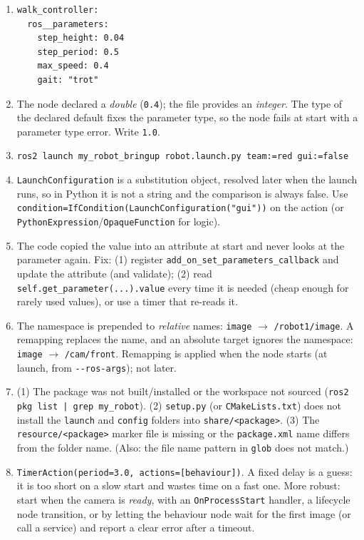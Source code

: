 \begin{enumerate}[label=\textbf{\ansnum.\arabic*}]
  \item
\begin{verbatim}
walk_controller:
  ros__parameters:
    step_height: 0.04
    step_period: 0.5
    max_speed: 0.4
    gait: "trot"
\end{verbatim}
  \item The node declared a \emph{double} (\verb!0.4!); the file provides an \emph{integer}. The type of the declared default fixes the parameter type, so the node fails at start with a parameter type error. Write \verb!1.0!.
  \item \verb!ros2 launch my_robot_bringup robot.launch.py team:=red gui:=false!
  \item \verb!LaunchConfiguration! is a substitution object, resolved later when the launch runs, so in Python it is not a string and the comparison is always false. Use \verb!condition=IfCondition(LaunchConfiguration("gui"))! on the action (or \verb!PythonExpression!/\verb!OpaqueFunction! for logic).
  \item The code copied the value into an attribute at start and never looks at the parameter again. Fix: (1) register \verb!add_on_set_parameters_callback! and update the attribute (and validate); (2) read \verb!self.get_parameter(...).value! every time it is needed (cheap enough for rarely used values), or use a timer that re-reads it.
  \item The namespace is prepended to \emph{relative} names: \verb!image! $\to$ \verb!/robot1/image!. A remapping replaces the name, and an absolute target ignores the namespace: \verb!image! $\to$ \verb!/cam/front!. Remapping is applied when the node starts (at launch, from \verb!--ros-args!); not later.
  \item (1) The package was not built/installed or the workspace not sourced (\verb!ros2 pkg list | grep my_robot!). (2) \verb!setup.py! (or \verb!CMakeLists.txt!) does not install the \verb!launch! and \verb!config! folders into \verb!share/<package>!. (3) The \verb!resource/<package>! marker file is missing or the \verb!package.xml! name differs from the folder name. (Also: the file name pattern in \verb!glob! does not match.)
  \item \verb!TimerAction(period=3.0, actions=[behaviour])!. A fixed delay is a guess: it is too short on a slow start and wastes time on a fast one. More robust: start when the camera is \emph{ready}, with an \verb!OnProcessStart! handler, a lifecycle node transition, or by letting the behaviour node wait for the first image (or call a service) and report a clear error after a timeout.

\end{enumerate}
